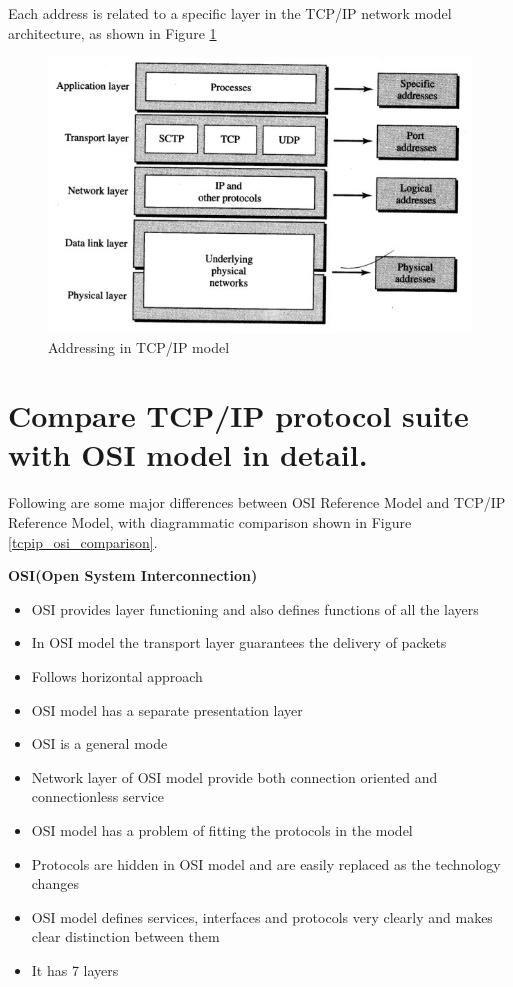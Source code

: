 \documentclass[a4paper,12pt]{report}
\begin{document}
Each address is related to a specific layer in the TCP/IP network model architecture, as shown in Figure \ref{addressing}

\begin{figure}[!htp]
\centering
\includegraphics[scale=0.6]{NetworkModel3.jpg}
\caption{Addressing in TCP/IP model}
\label{addressing}
\end{figure}

\section*{Compare TCP/IP protocol suite with OSI model in detail.}

Following are some major differences between OSI Reference Model and TCP/IP Reference Model, with diagrammatic comparison shown in Figure \ref{tcpip_osi_comparison}.

\textbf{OSI(Open System Interconnection)}
\begin{itemize}
\item OSI provides layer functioning and also defines functions of all the layers
\item In OSI model the transport layer guarantees the delivery of packets
\item Follows horizontal approach
\item OSI model has a separate presentation layer
\item OSI is a general mode
\item Network layer of OSI model provide both connection oriented and connectionless service
\item OSI model has a problem of fitting the protocols in the model
\item Protocols are hidden in OSI model and are easily replaced as the technology changes
\item OSI model defines services, interfaces and protocols very clearly and makes clear distinction between them
\item It has 7 layers
\end{itemize}
\end{document}
